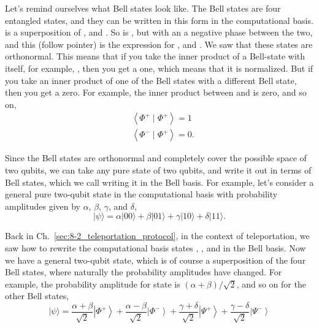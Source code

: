 Let's remind ourselves what Bell states look like.  The Bell states are four entangled states, and they can be written in this form in the computational basis. \ket{\Phi^+} is a superposition of  , and  . So is \ket{\Phi^-}, but with an a negative phase between the two, and this (follow pointer) is the expression for \ket{\Psi^+}, and \ket{\Psi^-}. We saw that these states are orthonormal. This means that if you take the inner product of a Bell-state with itself, for example, \ket{\Phi^+}, then you get a one, which means that it is normalized. But if you take an inner product of one of the Bell states with a different Bell state, then you get a zero. For example, the inner product between \ket{\Phi^-} and \ket{\Phi^+} is zero, and so on,
\begin{equation}
\begin{aligned}
&\left\langle\Phi^{+} \mid \Phi^{+}\right\rangle=1 \\
&\left\langle\Phi^{-} \mid \Phi^{+}\right\rangle=0.
\end{aligned}
\end{equation}

Since the Bell states are orthonormal and completely cover the possible space of two qubits, we can take any pure state of two qubits, and write it out in terms of Bell states, which we call writing it in the Bell basis. For example, let's consider a general pure two-qubit state in the computational basis with probability amplitudes given by $\alpha$, $\beta$, $\gamma$, and $\delta$,
\begin{equation}
|\psi\rangle=\alpha|00\rangle+\beta|01\rangle+\gamma|10\rangle+\delta|11\rangle.
\end{equation}

Back in Ch.~\ref{sec:8-2_teleportation_protocol}, in the context of teleportation, we saw how to rewrite the computational basis states , ,  and  in the Bell basis. Now we have a general two-qubit state, which is of course a superposition of the four Bell states, where naturally the probability amplitudes have changed. For example, the probability amplitude for state \ket{\Phi^+} is $(\alpha+\beta)/\sqrt{2}$, and so on for the other Bell states,
\begin{equation}
|\psi\rangle=\frac{\alpha+\beta}{\sqrt{2}}\left|\Phi^{+}\right\rangle+\frac{\alpha-\beta}{\sqrt{2}}\left|\Phi^{-}\right\rangle+\frac{\gamma+\delta}{\sqrt{2}}\left|\Psi^{+}\right\rangle+\frac{\gamma-\delta}{\sqrt{2}}\left|\Psi^{-}\right\rangle
\end{equation}

